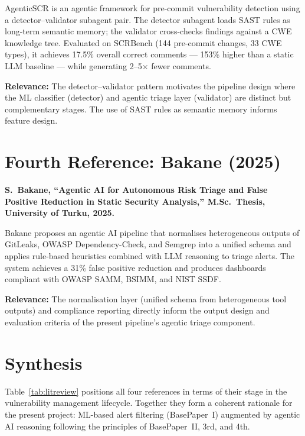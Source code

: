 AgenticSCR is an agentic framework for pre-commit vulnerability detection using a
detector--validator subagent pair. The detector subagent loads SAST rules as
long-term semantic memory; the validator cross-checks findings against a CWE
knowledge tree. Evaluated on SCRBench (144 pre-commit changes, 33 CWE types),
it achieves 17.5\% overall correct comments --- 153\% higher than a static LLM
baseline --- while generating 2--5$\times$ fewer comments.

\textbf{Relevance:} The detector--validator pattern motivates the pipeline design
where the ML classifier (detector) and agentic triage layer (validator) are
distinct but complementary stages. The use of SAST rules as semantic memory
informs feature design.

\section{Fourth Reference: Bakane (2025)}
\label{sec:4th}

\textbf{S.\ Bakane, ``Agentic AI for Autonomous Risk Triage and False Positive
Reduction in Static Security Analysis,'' M.Sc.\ Thesis, University of Turku, 2025.}
\cite{bakane2025thesis}

Bakane proposes an agentic AI pipeline that normalises heterogeneous outputs of
GitLeaks, OWASP Dependency-Check, and Semgrep into a unified schema and applies
rule-based heuristics combined with LLM reasoning to triage alerts. The system
achieves a 31\% false positive reduction and produces dashboards compliant with
OWASP SAMM, BSIMM, and NIST SSDF.

\textbf{Relevance:} The normalisation layer (unified schema from heterogeneous tool
outputs) and compliance reporting directly inform the output design and evaluation
criteria of the present pipeline's agentic triage component.

\section{Synthesis}

Table~\ref{tab:litreview} positions all four references in terms of their stage in
the vulnerability management lifecycle. Together they form a coherent rationale for
the present project: ML-based alert filtering (BasePaper~I) augmented by agentic AI
reasoning following the principles of BasePaper~II, 3rd, and 4th.

